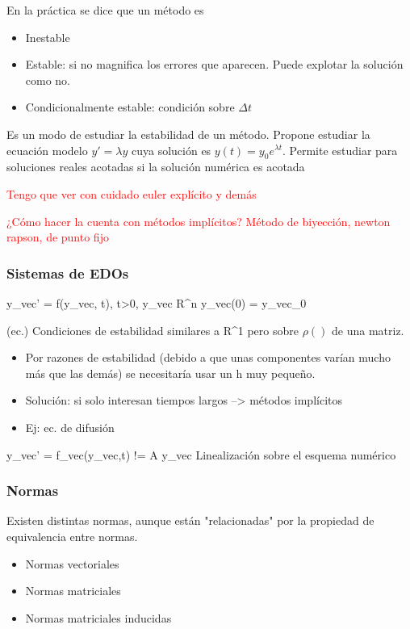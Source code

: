 \documentclass[aps,prb,twocolumn,superscriptaddress,floatfix,longbibliography]{revtex4-2}
\newcounter{para}
\begin{document}
En la práctica se dice que un método es
\begin{itemize}
    \item Inestable
    \item Estable: si no magnifica los errores que aparecen. Puede explotar la solución como no.
    \item Condicionalmente estable: condición sobre $\Delta t$
\end{itemize}

Es un modo de estudiar la estabilidad de un método. Propone estudiar la ecuación modelo $y' = \lambda y$ cuya solución es $y(t) = y_0 e^{\lambda t}$. Permite estudiar para soluciones reales acotadas si la solución numérica es acotada

\textcolor{red}{Tengo que ver con cuidado euler explícito y demás}


\textcolor{red}{¿Cómo hacer la cuenta con métodos implícitos?
Método de biyección, newton rapson, de punto fijo}





\subsubsection{Sistemas de EDOs}

y_vec' = f(y_vec, t), t>0, y_vec \in R^n
y_vec(0) = y_vec_0

(ec.)
Condiciones de estabilidad similares a R^1 pero sobre $\rho ()$ de una matriz.

\begin{itemize}
    \item Por razones de estabilidad (debido a que unas componentes varían mucho más que las demás) se necesitaría usar un h muy pequeño.
    \item Solución: si solo interesan tiempos largos --> métodos implícitos
    \item Ej: ec. de difusión
\end{itemize}

y_vec' = f_vec(y_vec,t) != A y_vec
Linealización sobre el esquema numérico


\subsubsection{Normas}
Existen distintas normas, aunque están "relacionadas" por la propiedad de equivalencia entre normas.
\begin{itemize}
    \item Normas vectoriales
    \item Normas matriciales
    \item Normas matriciales inducidas
\end{itemize}
\end{document}
